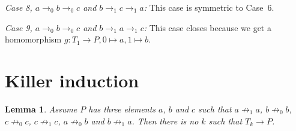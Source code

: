 \documentclass[a4paper]{article}
\newtheorem{lemma}[theorem]{Lemma}
\newcommand{\case}[2]{\vspace{1ex}\noindent\textit{Case #1, #2:}}
\begin{document}
\case{8}{$a \rightarrow_0 b \rightarrow_0 c$ and $b \rightarrow_1 c
\rightarrow_1 a$}
This case is symmetric to Case~6.

\case{9}{$a \rightarrow_0 b \rightarrow_0 c$ and $b \rightarrow_1 a
\rightarrow_1 c$} This case closes because we get a homomorphism $g :
T_1 \to P, 0 \mapsto a, 1 \mapsto b$.

\section{Killer induction}

\begin{lemma} \label{first killer lemma}
 Assume $P$ has three elements $a$, $b$ and $c$ such that $a \not
\rightarrow_1 a$, $b \not \rightarrow_0 b$, $c \not \rightarrow_0 c$,
$c \not \rightarrow_1 c$, $a \not \rightarrow_0 b$ and $b \not
\rightarrow_1 a$. Then there is no $k$ such that $T_k \to P$.
\end{lemma}
\end{document}
